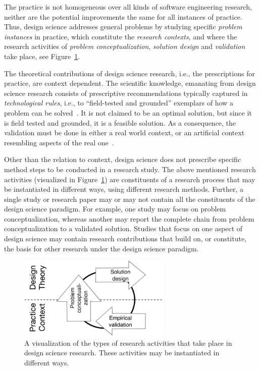 \documentclass[graybox]{svmult}
\begin{document}
The practice is not homogeneous over all kinds of software engineering research, neither are the potential improvements the same for all instances of practice. Thus, design science addresses general problems by studying specific \emph{problem instances} in practice, which constitute the \emph{research contexts}, and where the research activities of \emph{problem conceptualization}, \emph{solution design} and \emph{validation} take place, see Figure~\ref{fig:DS_process}. 


The theoretical contributions of design science research, i.e., the prescriptions for practice, are context dependent. The scientific knowledge, emanating from design science research consists of prescriptive recommendations typically captured in \emph{technological rules}, i.e., to ``field-tested and grounded'' exemplars of how a problem can be solved~\cite{van_aken_management_2004}. It is not claimed to be an optimal solution, but since it is field tested and grounded, it is a feasible solution.
As a consequence, the validation must be done in either a real world context, or an artificial context resembling aspects of the real one~\cite{wieringa_what_2014}.  

Other than the relation to context, design science does not prescribe specific method steps to be conducted in a research study. The above mentioned research activities (visualized in Figure~\ref{fig:DS_process}) are constituents of a research process that may be instantiated in different ways, using different research methods. 
Further, a single study or research paper may or may not contain all the constituents of the design science paradigm. For example, one study may focus on problem conceptualization, whereas another may report the complete chain from problem conceptualization to a validated solution. Studies that focus on one aspect of design science may contain research contributions that build on, or constitute, the basis for other research under the design science paradigm.


\begin{figure}[t]
\centering
 \includegraphics[width=0.65\textwidth]{Figures/DSSE_process.pdf}
\caption{A visualization of the types of research activities that take place in design science research. These activities may be instantiated in different ways.}
\label{fig:DS_process}       %
\end{figure}
\end{document}
